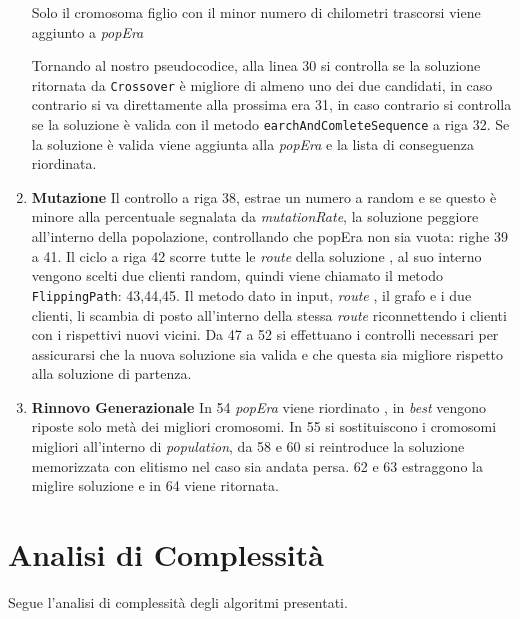 \documentclass[]{article}
\begin{document}
\begin{enumerate}
Solo il cromosoma figlio con il minor numero di chilometri trascorsi viene aggiunto a \textit{popEra} 


Tornando al nostro pseudocodice, alla linea 30 si controlla se la soluzione ritornata da \texttt{Crossover} è migliore di almeno uno dei due candidati, in caso contrario si va direttamente alla prossima era 31, in caso contrario si controlla se la soluzione è valida  con il metodo \texttt{earchAndComleteSequence} a riga 32. Se la soluzione è valida viene aggiunta alla \textit{popEra} e la lista di conseguenza riordinata.

\item \textbf{Mutazione}
Il controllo a riga 38, estrae un numero a random e se questo è minore alla percentuale segnalata da \textit{mutationRate}, la soluzione peggiore all'interno della popolazione, controllando che popEra non sia vuota: righe 39 a 41. Il ciclo a riga 42 scorre tutte le \emph{route} della soluzione , al suo interno vengono scelti due clienti random, quindi viene chiamato il metodo \texttt{FlippingPath}: 43,44,45.
Il metodo dato in input, \emph{route} , il grafo e i due clienti, li scambia di posto all'interno della stessa \emph{route} riconnettendo i clienti con i rispettivi nuovi vicini. Da 47 a 52 si effettuano i controlli necessari per assicurarsi che la nuova soluzione sia valida e che questa sia migliore rispetto alla soluzione di partenza.

\item \textbf{Rinnovo Generazionale}
In 54 \textit{popEra} viene riordinato , in \textit{best} vengono riposte solo metà dei migliori cromosomi. In 55 si sostituiscono i cromosomi migliori all'interno di \textit{population}, da 58 e 60 si reintroduce la soluzione memorizzata con elitismo nel caso sia andata persa. 62 e 63 estraggono la miglire soluzione e in 64 viene ritornata.

\end{enumerate}

\section{Analisi di Complessità}
Segue l'analisi di complessità degli algoritmi presentati.
\end{document}

